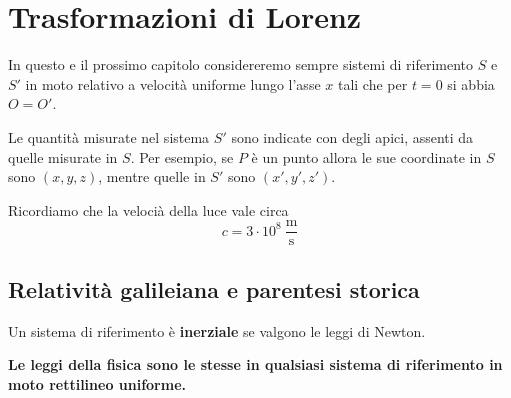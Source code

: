 \chapter{Trasformazioni di Lorenz}
In questo e il prossimo capitolo considereremo sempre sistemi di riferimento $S$ e $S'$ in moto relativo a velocit\`a uniforme lungo l'asse $x$ tali che per $t=0$ si abbia $O=O'$.
\begin{notation}
Le quantit\`a misurate nel sistema $S'$ sono indicate con degli apici, assenti da quelle misurate in $S$. Per esempio, se $P$ \`e un punto allora le sue coordinate in $S$ sono $(x,y,z)$, mentre quelle in $S'$ sono $(x',y',z')$.
\end{notation}

\noindent Ricordiamo che la veloci\`a della luce vale circa
\[c= 3\cdot 10^8\ \frac{\mathrm{m}}{\mathrm{s}}\]


\section{Relativit\`a galileiana e parentesi storica}
\begin{definition}
Un sistema di riferimento \`e \textbf{inerziale} se valgono le leggi di Newton.
\end{definition}

\begin{fact}
\textbf{Le leggi della fisica sono le stesse in qualsiasi sistema di riferimento in moto rettilineo uniforme.}
\end{fact}

